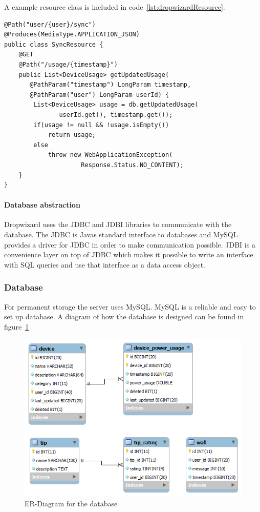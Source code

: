 A example resource class is included in code~\ref{lst:dropwizardResource}.
\newpage

\begin{lstlisting}[caption={Dropwizard resource example}, label={lst:dropwizardResource}]
@Path("user/{user}/sync")
@Produces(MediaType.APPLICATION_JSON)
public class SyncResource {
    @GET
    @Path("/usage/{timestamp}")
    public List<DeviceUsage> getUpdatedUsage(
	   @PathParam("timestamp") LongParam timestamp, 
	   @PathParam("user") LongParam userId) {
        List<DeviceUsage> usage = db.getUpdatedUsage(
		       userId.get(), timestamp.get());
        if(usage != null && !usage.isEmpty())
            return usage;
        else
            throw new WebApplicationException(
			         Response.Status.NO_CONTENT);
    }
}
\end{lstlisting}

\paragraph{Database abstraction}
Dropwizard uses the JDBC and JDBI libraries to communicate with the database. The JDBC is Javas standard interface to databases and MySQL provides a driver for JDBC in order to make communication possible. JDBI is a convenience layer on top of JDBC which makes it possible to write an interface with SQL queries and use that interface as a data access object.

\subsubsection{Database}
For permanent storage the server uses MySQL. MySQL is a reliable and easy to set up database. A diagram of how the database is designed can be found in figure~\ref{fig:ER-Diagram}

\begin{figure}[H]
\includegraphics[width=\textwidth]{ch/architecture/fig/ER-Diagram.png}
\caption{ER-Diagram for the database}
\label{fig:ER-Diagram}
\end{figure}